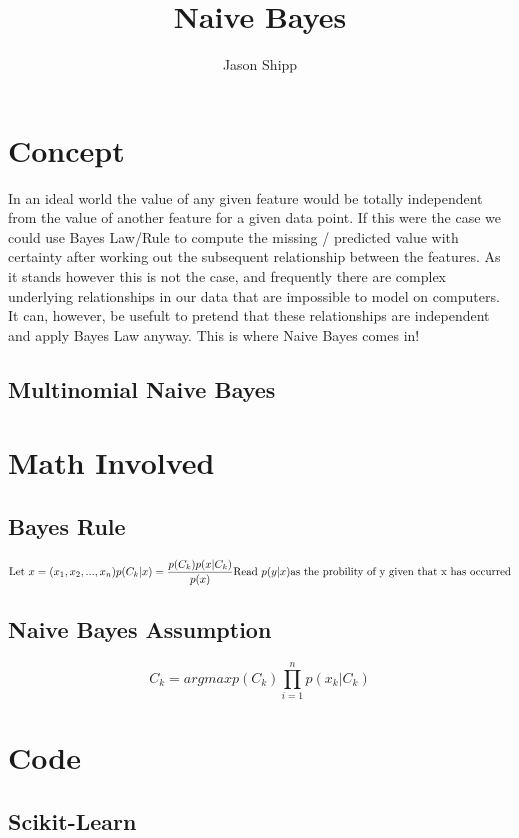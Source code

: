\documentclass{article}
\begin{document}
\title{Naive Bayes}
\author{Jason Shipp}
\maketitle

\section*{Concept}
In an ideal world the value of any given feature would be totally independent
from the value of another feature for a given data point. If this were the case
we could use Bayes Law/Rule to compute the missing / predicted value with
certainty after working out the subsequent relationship between the features. As
it stands however this is not the case, and frequently there are complex
underlying relationships in our data that are impossible to model on computers.
It can, however, be usefult to pretend that these relationships are independent
and apply Bayes Law anyway. This is where Naive Bayes comes in! 

\subsection*{Multinomial Naive Bayes}


\section*{Math Involved}

\subsection*{Bayes Rule} 
\begin{equation}
  \text{Let } x = (x_1, x_2, ..., x_n) \\
  p(C_k | x) = \frac{p(C_k)p(x | C_k)}{p(x)}\\
  \text{Read } p(y|x) \text{as the probility of y given that x has occurred}
\end{equation}

\subsection*{Naive Bayes Assumption}
\begin{equation}
  C_k = argmax p(C_k)\prod_{i=1}^{n}p(x_k | C_k)
\end{equation}

\section*{Code}
\subsection*{Scikit-Learn}
%  
\inputminted{octave}{../../Code/NaiveBayes.py}
\end{document}
